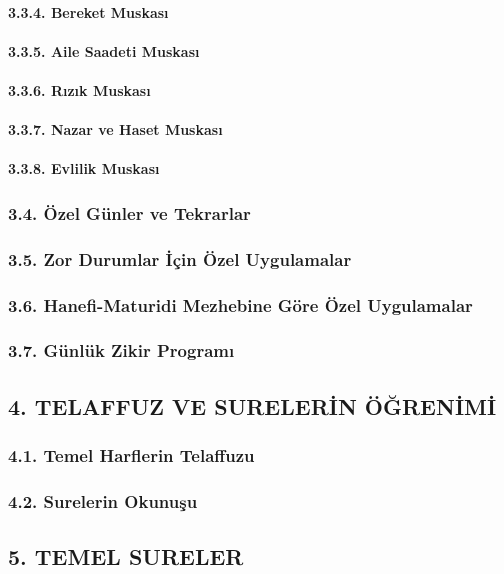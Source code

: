 \documentclass[12pt,a4paper]{article}
\begin{document}
\paragraph{3.3.4. Bereket Muskası}
\paragraph{3.3.5. Aile Saadeti Muskası}
\paragraph{3.3.6. Rızık Muskası}
\paragraph{3.3.7. Nazar ve Haset Muskası}
\paragraph{3.3.8. Evlilik Muskası}
\subsubsection{3.4. Özel Günler ve Tekrarlar}
\subsubsection{3.5. Zor Durumlar İçin Özel Uygulamalar}
\subsubsection{3.6. Hanefi-Maturidi Mezhebine Göre Özel Uygulamalar}
\subsubsection{3.7. Günlük Zikir Programı}
\subsection{4. TELAFFUZ VE SURELERİN ÖĞRENİMİ}
\subsubsection{4.1. Temel Harflerin Telaffuzu}
\subsubsection{4.2. Surelerin Okunuşu}
\subsection{5. TEMEL SURELER}
\end{document}
